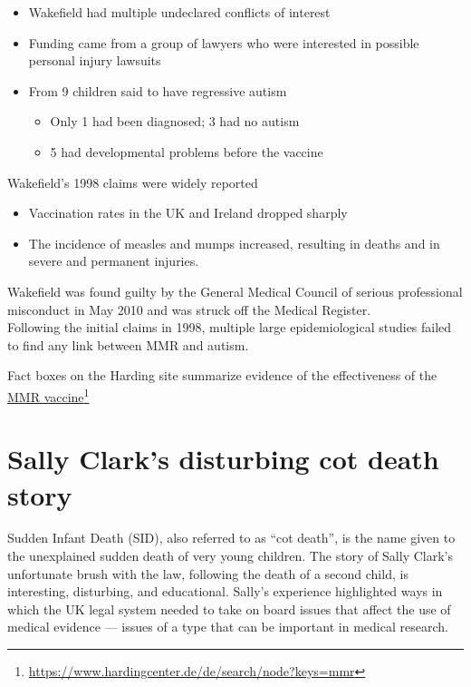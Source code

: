 \documentclass[
  10pt,
  b5paper]{book}
\providecommand{\tightlist}{%
  \setlength{\itemsep}{0pt}\setlength{\parskip}{0pt}}
\begin{document}
\begin{itemize}
\tightlist
\item
  Wakefield had multiple undeclared conflicts of interest
\item
  Funding came from a group of lawyers who were interested
  in possible personal injury lawsuits
\item
  From 9 children said to have regressive autism

  \begin{itemize}
  \tightlist
  \item
    Only 1 had been diagnosed; 3 had no autism
  \item
    5 had developmental problems before the vaccine
  \end{itemize}
\end{itemize}

Wakefield's 1998 claims were widely reported

\begin{itemize}
\tightlist
\item
  Vaccination rates in the UK and Ireland dropped sharply
\item
  The incidence of measles and mumps increased, resulting
  in deaths and in severe and permanent injuries.
\end{itemize}

Wakefield was found guilty by the General Medical Council of serious professional misconduct in May 2010 and was struck off the Medical Register.\\
Following the initial claims in 1998, multiple large epidemiological studies failed to find any link between MMR and autism.

Fact boxes on the Harding site summarize evidence of the
effectiveness of the \href{https://www.hardingcenter.de/de/search/node?keys=mmr}{MMR vaccine}\footnote{\url{https://www.hardingcenter.de/de/search/node?keys=mmr}}

\hypertarget{sally-clarks-disturbing-cot-death-story}{%
\section{Sally Clark's disturbing cot death story}\label{sally-clarks-disturbing-cot-death-story}}

Sudden Infant Death (SID), also referred to as ``cot death'',
is the name given to the unexplained sudden death of very
young children. The story of Sally Clark's unfortunate brush
with the law, following the death of a second child, is
interesting, disturbing, and educational. Sally's experience
highlighted ways in which the UK legal system needed to take
on board issues that affect the use of medical evidence ---
issues of a type that can be important in medical research.
\end{document}
